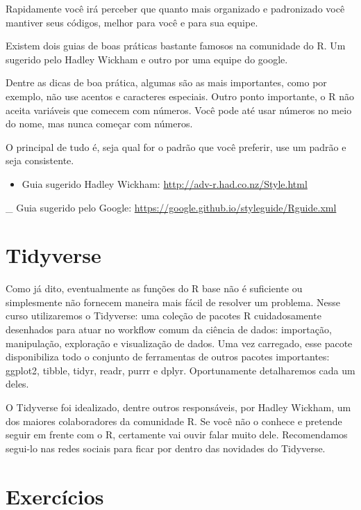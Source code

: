 \documentclass[]{book}
\providecommand{\tightlist}{%
  \setlength{\itemsep}{0pt}\setlength{\parskip}{0pt}}
\begin{document}
Rapidamente você irá perceber que quanto mais organizado e padronizado
você mantiver seus códigos, melhor para você e para sua equipe.

Existem dois guias de boas práticas bastante famosos na comunidade do R.
Um sugerido pelo Hadley Wickham e outro por uma equipe do google.

Dentre as dicas de boa prática, algumas são as mais importantes, como
por exemplo, não use acentos e caracteres especiais. Outro ponto
importante, o R não aceita variáveis que comecem com números. Você pode
até usar números no meio do nome, mas nunca começar com números.

O principal de tudo é, seja qual for o padrão que você preferir, use um
padrão e seja consistente.

\begin{itemize}
\tightlist
\item
  Guia sugerido Hadley Wickham: \url{http://adv-r.had.co.nz/Style.html}
\end{itemize}

\_ Guia sugerido pelo Google:
\url{https://google.github.io/styleguide/Rguide.xml}

\section{Tidyverse}\label{tidyverse}

Como já dito, eventualmente as funções do R base não é suficiente ou
simplesmente não fornecem maneira mais fácil de resolver um problema.
Nesse curso utilizaremos o Tidyverse: uma coleção de pacotes R
cuidadosamente desenhados para atuar no workflow comum da ciência de
dados: importação, manipulação, exploração e visualização de dados. Uma
vez carregado, esse pacote disponibiliza todo o conjunto de ferramentas
de outros pacotes importantes: ggplot2, tibble, tidyr, readr, purrr e
dplyr. Oportunamente detalharemos cada um deles.

O Tidyverse foi idealizado, dentre outros responsáveis, por Hadley
Wickham, um dos maiores colaboradores da comunidade R. Se você não o
conhece e pretende seguir em frente com o R, certamente vai ouvir falar
muito dele. Recomendamos segui-lo nas redes sociais para ficar por
dentro das novidades do Tidyverse.

\section{Exercícios}\label{exercicios-1}
\end{document}
